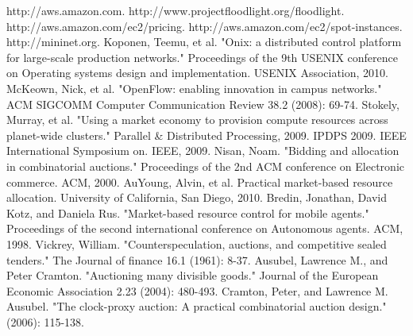 \documentclass[a4paper,11pt,twocolumn]{article}
\begin{document}
\begin{thebibliography}{99}
  http://aws.amazon.com.
  http://www.projectfloodlight.org/floodlight.
  http://aws.amazon.com/ec2/pricing.
  http://aws.amazon.com/ec2/spot-instances.
  http://mininet.org.
  Koponen, Teemu, et al. "Onix: a distributed control platform for large-scale production networks." Proceedings of the 9th USENIX conference on Operating systems design and implementation. USENIX Association, 2010.
  McKeown, Nick, et al. "OpenFlow: enabling innovation in campus networks." ACM SIGCOMM Computer Communication Review 38.2 (2008): 69-74.
  Stokely, Murray, et al. "Using a market economy to provision compute resources across planet-wide clusters." Parallel \& Distributed Processing, 2009. IPDPS 2009. IEEE International Symposium on. IEEE, 2009.
  Nisan, Noam. "Bidding and allocation in combinatorial auctions." Proceedings of the 2nd ACM conference on Electronic commerce. ACM, 2000.
  AuYoung, Alvin, et al. Practical market-based resource allocation. University of California, San Diego, 2010.
  Bredin, Jonathan, David Kotz, and Daniela Rus. "Market-based resource control for mobile agents." Proceedings of the second international conference on Autonomous agents. ACM, 1998.
  Vickrey, William. "Counterspeculation, auctions, and competitive sealed tenders." The Journal of finance 16.1 (1961): 8-37.
  Ausubel, Lawrence M., and Peter Cramton. "Auctioning many divisible goods." Journal of the European Economic Association 2.23 (2004): 480-493.
  Cramton, Peter, and Lawrence M. Ausubel. "The clock-proxy auction: A practical combinatorial auction design." (2006): 115-138.
 
\end{thebibliography}
\end{document}
